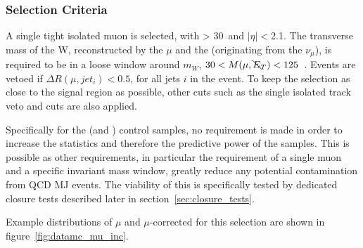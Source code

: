 \subsubsection{Selection Criteria}
\label{sec:mujets_control_selection}
A single tight isolated muon is selected, with \Pt > 30~\gev and $|\eta| <$2.1.
The transverse mass of the W, reconstructed by the 
$\mu$ and the \met (originating from the $\nu_{\mu}$), is required to be in a 
loose window around $m_W$, $30 < M(\mu, \bcancel{E}_T) < 125$~\gev. Events are vetoed if
$\Delta R(\mu, jet_{i}) < 0.5$,
for all jets $i$ in the event. To keep the selection as close to the signal 
region as possible, other cuts such as the single isolated track veto and 
\mhtmet cuts are also applied.

Specifically for the \mj (and \mmj) control samples, no \alphat requirement is
made in order to increase the statistics and therefore the predictive power of 
the samples. This is possible as other requirements, in particular the 
requirement of
a single muon and a specific invariant mass window, greatly reduce any potential
contamination from QCD MJ events. The viability of this is specifically tested 
by dedicated closure tests described later in section~\ref{sec:closure_tests}.

Example distributions of $\mu$ \Pt and $\mu\text{-corrected}$ \met for this selection
are shown in figure~\ref{fig:datamc_mu_inc}.

